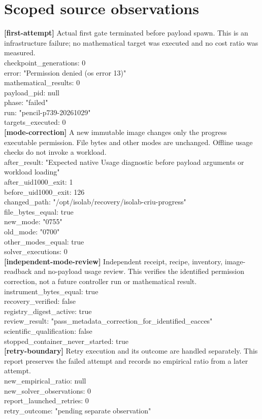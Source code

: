 \documentclass[11pt]{article}
\begin{document}
\section*{Scoped source observations}
\textbf{[first-attempt]} Actual first gate terminated before payload spawn. This is an infrastructure failure; no mathematical target was executed and no cost ratio was measured.\\
checkpoint\_generations: 0\\
error: "Permission denied (os error 13)"\\
mathematical\_results: 0\\
payload\_pid: null\\
phase: "failed"\\
run: "pencil-p739-20261029"\\
targets\_executed: 0\\
\textbf{[mode-correction]} A new immutable image changes only the progress executable permission. File bytes and other modes are unchanged. Offline usage checks do not invoke a workload.\\
after\_result: "Expected native Usage diagnostic before payload arguments or workload loading"\\
after\_uid1000\_exit: 1\\
before\_uid1000\_exit: 126\\
changed\_path: "/opt/isolab/recovery/isolab-criu-progress"\\
file\_bytes\_equal: true\\
new\_mode: "0755"\\
old\_mode: "0700"\\
other\_modes\_equal: true\\
solver\_executions: 0\\
\textbf{[independent-mode-review]} Independent receipt, recipe, inventory, image-readback and no-payload usage review. This verifies the identified permission correction, not a future controller run or mathematical result.\\
instrument\_bytes\_equal: true\\
recovery\_verified: false\\
registry\_digest\_active: true\\
review\_result: "pass\_metadata\_correction\_for\_identified\_eacces"\\
scientific\_qualification: false\\
stopped\_container\_never\_started: true\\
\textbf{[retry-boundary]} Retry execution and its outcome are handled separately. This report preserves the failed attempt and records no empirical ratio from a later attempt.\\
new\_empirical\_ratio: null\\
new\_solver\_observations: 0\\
report\_launched\_retries: 0\\
retry\_outcome: "pending separate observation"\\
\end{document}
